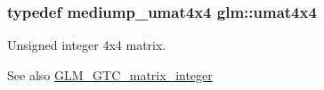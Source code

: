 \subsubsection[{\texorpdfstring{umat4x4}{umat4x4}}]{\setlength{\rightskip}{0pt plus 5cm}typedef mediump\+\_\+umat4x4 {\bf glm\+::umat4x4}}\hypertarget{group__gtc__matrix__integer_gae0931b79e808fb0983848778a60eb548}{}\label{group__gtc__matrix__integer_gae0931b79e808fb0983848778a60eb548}
Unsigned integer 4x4 matrix. \begin{DoxySeeAlso}{See also}
\hyperlink{group__gtc__matrix__integer}{G\+L\+M\+\_\+\+G\+T\+C\+\_\+matrix\+\_\+integer} 
\end{DoxySeeAlso}
